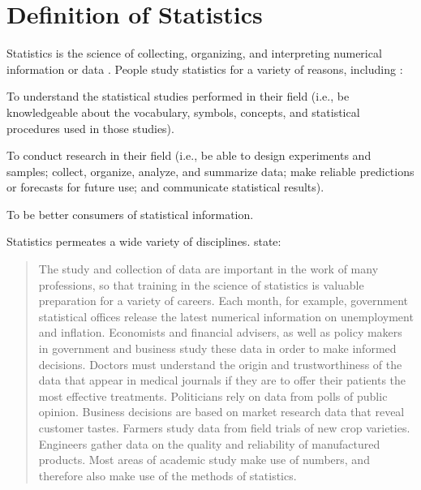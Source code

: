 \documentclass[10pt,openany]{book}\usepackage[]{graphicx}\usepackage[]{color}
\begin{document}
\section{Definition of Statistics}
Statistics is the science of collecting, organizing, and interpreting numerical information or data \citep{MooreMcCabe1998}. People study statistics for a variety of reasons, including \citep{Bluman2000}:
\begin{Enumerate}
  \item To understand the statistical studies performed in their field (i.e., be knowledgeable about the vocabulary, symbols, concepts, and statistical procedures used in those studies).
  \item To conduct research in their field (i.e., be able to design experiments and samples; collect, organize, analyze, and summarize data; make reliable predictions or forecasts for future use; and communicate statistical results).
  \item To be better consumers of statistical information.
\end{Enumerate}

Statistics permeates a wide variety of disciplines. \cite{MooreMcCabe1998} state:
\begin{quote}
The study and collection of data are important in the work of many professions, so that training in the science of statistics is valuable preparation for a variety of careers. Each month, for example, government statistical offices release the latest numerical information on unemployment and inflation. Economists and financial advisers, as well as policy makers in government and business study these data in order to make informed decisions. Doctors must understand the origin and trustworthiness of the data that appear in medical journals if they are to offer their patients the most effective treatments. Politicians rely on data from polls of public opinion. Business decisions are based on market research data that reveal customer tastes. Farmers study data from field trials of new crop varieties. Engineers gather data on the quality and reliability of manufactured products. Most areas of academic study make use of numbers, and therefore also make use of the methods of statistics.
\end{quote}

\end{document}
